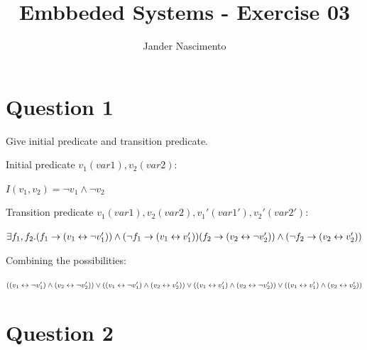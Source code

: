 \documentclass[a4paper]{article}
\begin{document}
\title{Embbeded Systems - Exercise 03}

\author{Jander Nascimento}

\maketitle

\section*{Question 1}

Give initial predicate and transition predicate.

Initial predicate $v_1(var1),v_2(var2)$:

$I(v_1,v_2)=\neg v_1 \land \neg v_2 $

Transition predicate $v_1(var1),v_2(var2),v_1'(var1'),v_2'(var2')$:

$\exists f_1,f_2.\newline 
(f_1 \rightarrow (v_1 \leftrightarrow \neg v_1')) \land (\neg f_1 \rightarrow (v_1 \leftrightarrow v_1')) \newline
(f_2 \rightarrow (v_2 \leftrightarrow \neg v_2')) \land (\neg f_2 \rightarrow (v_2 \leftrightarrow v_2'))
$

Combining the possibilities:

$
((v_1 \leftrightarrow \neg v_1') \land (v_2 \leftrightarrow \neg v_2')) \lor \newline
((v_1 \leftrightarrow \neg v_1') \land (v_2 \leftrightarrow v_2')) \lor \newline
((v_1 \leftrightarrow v_1') \land (v_2 \leftrightarrow \neg v_2')) \lor \newline
((v_1 \leftrightarrow v_1') \land (v_2 \leftrightarrow v_2')) \newline
$




\section*{Question 2}
\end{document}
